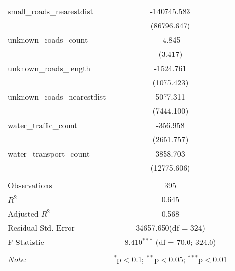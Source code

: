 \begin{table}[!htbp]
\begin{tabular}{@{\extracolsep{5pt}}lc}
 small_roads_nearestdist & -140745.583$^{}$ \\
  & (86796.647) \\
 unknown_roads_count & -4.845$^{}$ \\
  & (3.417) \\
 unknown_roads_length & -1524.761$^{}$ \\
  & (1075.423) \\
 unknown_roads_nearestdist & 5077.311$^{}$ \\
  & (7444.100) \\
 water_traffic_count & -356.958$^{}$ \\
  & (2651.757) \\
 water_transport_count & 3858.703$^{}$ \\
  & (12775.606) \\
\hline \\[-1.8ex]
 Observations & 395 \\
 $R^2$ & 0.645 \\
 Adjusted $R^2$ & 0.568 \\
 Residual Std. Error & 34657.650(df = 324)  \\
 F Statistic & 8.410$^{***}$ (df = 70.0; 324.0) \\
\hline
\hline \\[-1.8ex]
\textit{Note:} & \multicolumn{1}{r}{$^{*}$p$<$0.1; $^{**}$p$<$0.05; $^{***}$p$<$0.01} \\
\end{tabular}
\end{table}